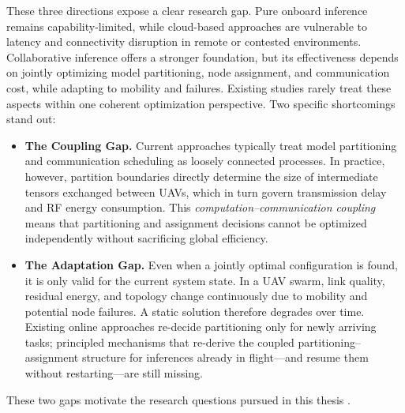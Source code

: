 These three directions expose a clear research gap. Pure onboard inference remains capability-limited, while cloud-based approaches are vulnerable to latency and connectivity disruption in remote or contested environments. Collaborative inference offers a stronger foundation, but its effectiveness depends on jointly optimizing model partitioning, node assignment, and communication cost, while adapting to mobility and failures. Existing studies rarely treat these aspects within one coherent optimization perspective. Two specific shortcomings stand out:

\begin{itemize}
  \item \textbf{The Coupling Gap.} Current approaches typically treat model partitioning and communication scheduling as loosely connected processes. In practice, however, partition boundaries directly determine the size of intermediate tensors exchanged between UAVs, which in turn govern transmission delay and RF energy consumption. This \emph{computation--communication coupling} means that partitioning and assignment decisions cannot be optimized independently without sacrificing global efficiency.

  \item \textbf{The Adaptation Gap.} Even when a jointly optimal configuration is found, it is only valid for the current system state. In a UAV swarm, link quality, residual energy, and topology change continuously due to mobility and potential node failures. A static solution therefore degrades over time. Existing online approaches re-decide partitioning only for newly arriving tasks; principled mechanisms that re-derive the coupled partitioning--assignment structure for inferences already in flight---and resume them without restarting---are still missing.
\end{itemize}

These two gaps motivate the research questions pursued in this thesis \cite{qu2024elastic,lansky2023firefly,hosseinzadeh2024local,pan2025selfhealing,jamshidi2025resilient}.
